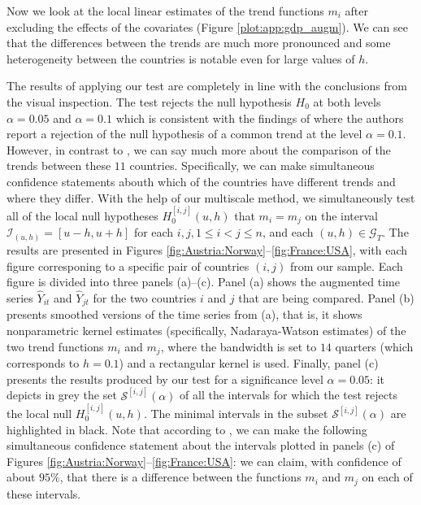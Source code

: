 \documentclass[a4paper,12pt]{article}
\makeatletter
\renewcommand{\eqref}[1]{\tagform@{\ref{#1}}}
\makeatother
\begin{document}
Now we look at the local linear estimates of the trend functions $m_i$ after excluding the effects of the covariates (Figure \ref{plot:app:gdp_augm}). We can see that the differences between the trends are much more pronounced and some heterogeneity between the countries is notable even for large values of $h$.

The results of applying our test are completely in line with the conclusions from the visual inspection. The test rejects the null hypothesis $H_0$ at both levels $\alpha =0.05$ and $\alpha = 0.1$ which is consistent with the findings of \cite{Zhang2012} where the authors report a rejection of the null hypothesis of a common trend at the level $\alpha = 0.1$. However, in contrast to \cite{Zhang2012}, we can say much more about the comparison of the trends between these $11$ countries. Specifically, we can make simultaneous confidence statements abouth which of the countries have different trends and where they differ. With the help of our multiscale method, we simultaneously test all of the local null hypotheses $H_0^{[i,j]}(u, h)$ that $m_i = m_j$ on the interval $\mathcal{I}_{(u, h)} = [u-h, u+h]$ for each $i, j, 1 \le i < j \le n$, and each $(u, h) \in \mathcal{G}_T$. The results are presented in Figures \ref{fig:Austria:Norway}--\ref{fig:France:USA}, with each figure corresponing to a specific pair of countries $(i,j)$ from our sample. Each figure is divided into three panels (a)--(c).  Panel (a) shows the augmented time series $\widehat{Y}_{it}$ and $\widehat{Y}_{jt}$ for the two countries $i$ and $j$ that are being compared. Panel (b) presents smoothed versions of the time series from (a), that is, it shows nonparametric kernel estimates (specifically, Nadaraya-Watson estimates) of the two trend functions $m_i$ and $m_j$, where the bandwidth is set to $14$ quarters (which corresponds to $h = 0.1$) and a rectangular kernel is used. Finally, panel (c) presents the results produced by our test for a significance level $\alpha = 0.05$: it depicts in grey the set $\mathcal{S}^{[i,j]}(\alpha)$ of all the intervals for which the test rejects the local null $H_0^{[i, j]}(u, h)$. The minimal intervals in the subset $\mathcal{S}^{[i,j]}(\alpha)$ are highlighted in black. Note that according to \eqref{corollary1}, we can make the following simultaneous confidence statement about the intervals plotted in panels (c) of Figures \ref{fig:Austria:Norway}--\ref{fig:France:USA}: we can claim, with confidence of about $95\%$, that there is a difference between the functions $m_i$ and $m_j$ on each of these intervals. 
\end{document}
